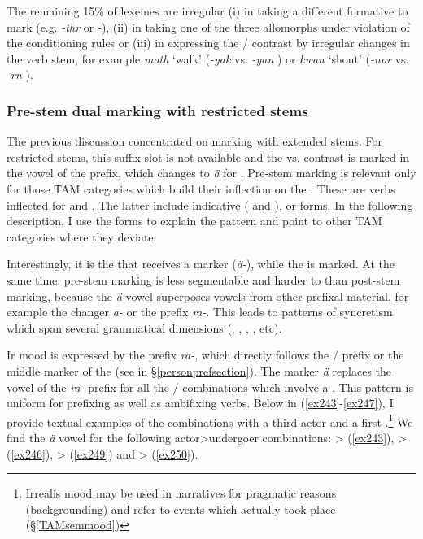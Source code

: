 The remaining 15\% of  lexemes are irregular (i) in taking a different formative to mark  (e.g. \emph{-thr} or \emph{-\Zero}), (ii) in taking one of the three allomorphs under violation of the conditioning rules or (iii) in expressing the / contrast by irregular changes in the verb stem, for example \emph{moth} `walk' (\emph{-yak} \Ndu{} vs. \emph{-yan} \Du) or \emph{kwan} `shout' (\emph{-nor} \Ndu{} vs. \emph{-rn} \Du).

\subsubsection{Pre-stem dual marking with restricted stems} \label{prerootdual}

The previous discussion concentrated on  marking with extended stems. For restricted stems, this suffix slot is not available and the  vs.  contrast is marked in the vowel of the prefix, which changes to \emph{ä} for . Pre-stem  marking is relevant only for those TAM categories which build their inflection on the . These are verbs inflected for  and  . The latter include indicative ( and  ),  or  forms. In the following description, I use the   forms to explain the pattern and point to other TAM categories where they deviate.%

Interestingly, it is the  that receives a marker (\emph{ä-}), while the  is  marked. At the same time, pre-stem  marking is less segmentable and harder to  than post-stem  marking, because the  \emph{ä} vowel superposes vowels from other prefixal material, for example the  changer \emph{a-} or the  prefix \emph{ra-}. This leads to patterns of syncretism which span several grammatical dimensions (, , , , etc).%

Ir mood is expressed by the prefix \emph{ra-}, which directly follows the / prefix or the middle marker of the \Bet{}  (see  in \S{}\ref{personprefsection}). The  marker \emph{ä} replaces the vowel of the \emph{ra-} prefix for all the / combinations which involve a  . This pattern is uniform for prefixing as well as ambifixing verbs. Below in (\ref{ex243}-\ref{ex247}), I provide textual examples of the  combinations with a third  actor and a first  .\footnote{Irrealis mood may be used in narratives for pragmatic reasons (backgrounding) and refer to events which actually took place (\S{}\ref{TAMsemmood})} We find the \emph{ä} vowel for the following actor>undergoer combinations: \Sg>\Sg{} (\ref{ex243}), \Pl>\Sg{} (\ref{ex246}), \Sg>\Pl{} (\ref{ex249}) and \Pl>\Pl{} (\ref{ex250}).

